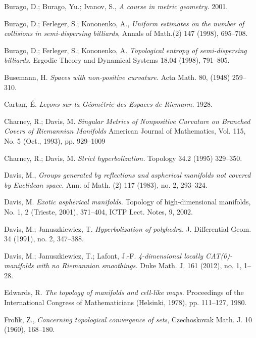 \begin{thebibliography}{52}
Burago, D.; 
Burago, Yu.; 
Ivanov, S., 
\textit{A course in metric geometry.} 2001. 

Burago, D.; 
Ferleger, S.; 
Kononenko, A.,
\textit{Uniform estimates on the number of collisions in semi-dispersing billiards},
Annals of Math.(2) 147 (1998), 695--708.

Burago, D.; 
Ferleger, S.;
Kononenko, A. 
\textit{Topological entropy of semi-dispersing billiards.} 
Ergodic Theory and Dynamical Systems 
18.04 
(1998), 
791--805.

Busemann, H. 
\textit{Spaces with non-positive curvature.} 
Acta Math. 
80, 
(1948) 
259--310.

Cartan, \'E.
\textit{Le\c{c}ons sur la G\'eom\'etrie des Espaces de Riemann.} 1928.

Charney, R.;
Davis, M.
\textit{Singular Metrics of Nonpositive Curvature on Branched Covers of Riemannian Manifolds}
American Journal of Mathematics, 
Vol. 115, 
No. 5 
(Oct., 1993), 
pp. 929--1009

Charney, R.; Davis, M. 
\textit{Strict hyperbolization.} 
Topology 
34.2 
(1995) 
329--350.

Davis, M., 
\textit{Groups generated by reflections and aspherical manifolds not covered by Euclidean space.}
Ann. of Math. 
(2) 117 
(1983), 
no. 2, 
293--324. 

Davis, M. 
\textit{Exotic aspherical manifolds.} 
Topology of high-dimensional manifolds, 
No. 1, 2 (Trieste, 2001), 371--404, ICTP Lect. Notes, 9, 2002.



Davis, M.; 
Januszkiewicz, T. 
\textit{Hyperbolization of polyhedra.} 
J. Differential Geom. 
34 
(1991), 
no. 2, 
347--388.

Davis, M.; 
Januszkiewicz, T.; 
Lafont, J.-F.
\textit{4-dimensional locally CAT(0)-manifolds with no Riemannian smoothings.} 
Duke Math. J. 
161 
(2012), 
no. 1, 
1--28.

Edwards, R. 
\textit{The topology of manifolds and cell-like maps.} Proceedings of the International Congress of Mathematicians (Helsinki, 1978), pp. 111--127, 1980.

Frol\'{\i}k, Z., 
\textit{Concerning topological convergence of sets}, Czechoskovak Math. J. 
10 
(1960), 
168--180.


\end{thebibliography}
